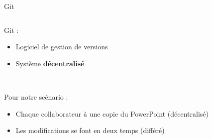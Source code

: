 \begin{frame}{Git}
\begin{columns}
  \begin{column}{.55\textwidth}
  Git :
  \begin{itemize}
    \item Logiciel de gestion de versions
    \item Système \textbf{décentralisé} 
  \end{itemize}~

  Pour notre scénario :
  \begin{itemize}
    \item Chaque collaborateur à une copie du PowerPoint (décentralisé)
    \item Les modifications se font en deux temps (différé)
  \end{itemize}
  \end{column}


\end{columns}
\end{frame}
